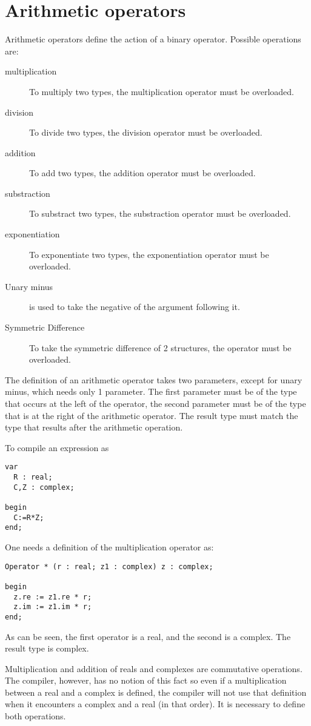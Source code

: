 \section{Arithmetic operators}
Arithmetic operators define the action of a binary operator. Possible
operations are:
\begin{description}
\item[multiplication] To multiply two types, the \var{*} multiplication
operator must be overloaded.
\item[division] To divide two types, the \var{/} division
operator must be overloaded.
\item[addition] To add two types, the \var{+} addition
operator must be overloaded.
\item[substraction] To substract two types, the \var{-} substraction
operator must be overloaded.
\item[exponentiation] To exponentiate two types, the \var{**} exponentiation
operator must be overloaded.
\item[Unary minus] is used to take the negative of the argument following
it.
\item[Symmetric Difference] To take the symmetric difference of 2
structures, the \var{><} operator must be overloaded.
\end{description}

The definition of an arithmetic operator takes two parameters, except for
unary minus, which needs only 1 parameter. The first parameter must be of 
the type that occurs at the left of the operator, the second parameter must 
be of the type that is at the right of the arithmetic operator. The result 
type must match the type that results after the arithmetic operation.

To compile an expression as
\begin{verbatim}
var
  R : real;
  C,Z : complex;

begin
  C:=R*Z;
end;
\end{verbatim}
One needs a definition of the multiplication operator as:
\begin{verbatim}
Operator * (r : real; z1 : complex) z : complex;

begin
  z.re := z1.re * r;
  z.im := z1.im * r;
end;
\end{verbatim}
As can be seen, the first operator is a real, and the second is
a complex. The result type is complex.

Multiplication and addition of reals and complexes are commutative
operations. The compiler, however, has no notion of this fact so even
if a multiplication between a real and a complex is defined, the
compiler will not use that definition when it encounters a complex
and a real (in that order). It is necessary to define both operations.

